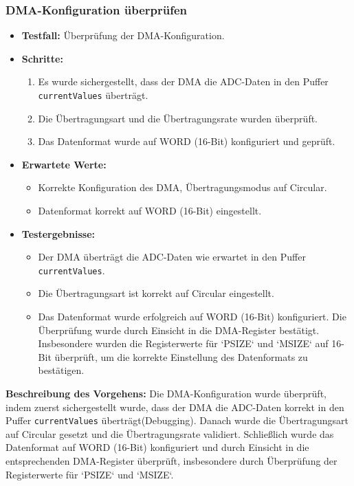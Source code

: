 \subsubsection{DMA-Konfiguration überprüfen}
\begin{itemize}
	\item \textbf{Testfall:} Überprüfung der DMA-Konfiguration.
	\item \textbf{Schritte:}
	\begin{enumerate}
		\item Es wurde sichergestellt, dass der DMA die ADC-Daten in den Puffer \texttt{currentValues} überträgt.
		\item Die Übertragungsart und die Übertragungsrate wurden überprüft.
		\item Das Datenformat wurde auf WORD (16-Bit) konfiguriert und geprüft.
	\end{enumerate}
	\item \textbf{Erwartete Werte:}
	\begin{itemize}
		\item Korrekte Konfiguration des DMA, Übertragungsmodus auf Circular.
		\item Datenformat korrekt auf WORD (16-Bit) eingestellt.
	\end{itemize}
	\item \textbf{Testergebnisse:}
	\begin{itemize}
		\item Der DMA überträgt die ADC-Daten wie erwartet in den Puffer \texttt{currentValues}.
		\item Die Übertragungsart ist korrekt auf Circular eingestellt.
		\item Das Datenformat wurde erfolgreich auf WORD (16-Bit) konfiguriert. Die Überprüfung wurde durch Einsicht in die DMA-Register bestätigt. Insbesondere wurden die Registerwerte für `PSIZE` und `MSIZE` auf 16-Bit überprüft, um die korrekte Einstellung des Datenformats zu bestätigen.
	\end{itemize}
\end{itemize}


\textbf{Beschreibung des Vorgehens:}
Die DMA-Konfiguration wurde überprüft, indem zuerst sichergestellt wurde, dass der DMA die ADC-Daten korrekt in den Puffer \texttt{currentValues} überträgt(Debugging). Danach wurde die Übertragungsart auf Circular gesetzt und die Übertragungsrate validiert. Schließlich wurde das Datenformat auf WORD (16-Bit) konfiguriert und durch Einsicht in die entsprechenden DMA-Register überprüft, insbesondere durch Überprüfung der Registerwerte für `PSIZE` und `MSIZE`.

